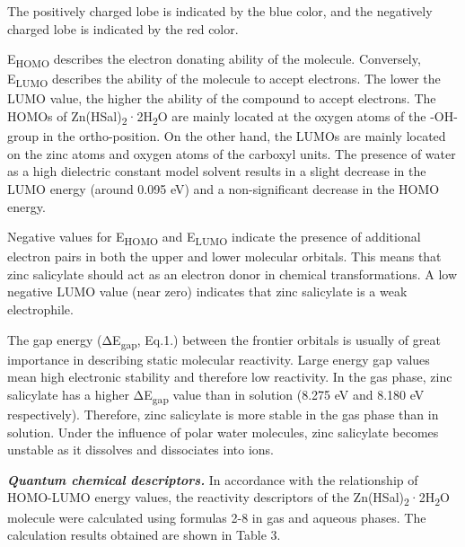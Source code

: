 \begin{multicols}{2}
The positively charged lobe is indicated by the blue color, and the
negatively charged lobe is indicated by the red color.

E\textsubscript{HOMO} describes the electron donating ability of the
molecule. Conversely, E\textsubscript{LUMO} describes the ability of the
molecule to accept electrons. The lower the LUMO value, the higher the
ability of the compound to accept electrons. The HOMOs of
Zn(HSal)\textsubscript{2}·2H\textsubscript{2}O are mainly located at the
oxygen atoms of the -OH-group in the ortho-position. On the other hand,
the LUMOs are mainly located on the zinc atoms and oxygen atoms of the
carboxyl units. The presence of water as a high dielectric constant
model solvent results in a slight decrease in the LUMO energy (around
0.095 eV) and a non-significant decrease in the HOMO energy.

Negative values for E\textsubscript{HOMO} and E\textsubscript{LUMO}
indicate the presence of additional electron pairs in both the upper and
lower molecular orbitals. This means that zinc salicylate should act as
an electron donor in chemical transformations. A low negative LUMO value
(near zero) indicates that zinc salicylate is a weak electrophile.

The gap energy (ΔE\textsubscript{gap}, Eq.1.) between the frontier
orbitals is usually of great importance in describing static molecular
reactivity. Large energy gap values \hspace{0pt}\hspace{0pt}mean high
electronic stability and therefore low reactivity. In the gas phase,
zinc salicylate has a higher ΔE\textsubscript{gap} value than in
solution (8.275 eV and 8.180 eV respectively). Therefore, zinc
salicylate is more stable in the gas phase than in solution. Under the
influence of polar water molecules, zinc salicylate becomes unstable as
it dissolves and dissociates into ions.

{\bfseries \emph{Quantum chemical descriptors.}} In accordance with the
relationship of HOMO-LUMO energy values, the reactivity descriptors of
the Zn(HSal)\textsubscript{2}·2H\textsubscript{2}O molecule were
calculated using formulas 2-8 in gas and aqueous phases. The calculation
results obtained are shown in Table 3.
\end{multicols}


